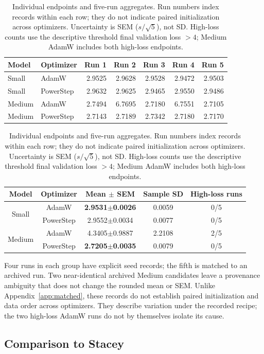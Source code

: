 \documentclass{article}
\begin{document}
\begin{table}[ht]
\centering\small

\begin{tabular}{llrrrrr}\toprule
Model & Optimizer & Run 1 & Run 2 & Run 3 & Run 4 & Run 5\\\midrule
Small & AdamW & 2.9525 & 2.9628 & 2.9528 & 2.9472 & 2.9503\\
Small & PowerStep & 2.9632 & 2.9625 & 2.9465 & 2.9550 & 2.9486\\
Medium & AdamW & 2.7494 & 6.7695 & 2.7180 & 6.7551 & 2.7105\\
Medium & PowerStep & 2.7143 & 2.7189 & 2.7342 & 2.7180 & 2.7170\\\bottomrule
\end{tabular}

\medskip
\begin{tabular}{ccccc}\toprule
Model & Optimizer & Mean $\pm$ SEM & Sample SD & High-loss runs\\\midrule
\multirow{2}{*}{Small} & AdamW & \textbf{2.9531$\pm$0.0026}  & 0.0059 & 0/5\\
& PowerStep & 2.9552$\pm$0.0034 & 0.0077 & 0/5\\
\multirow{2}{*}{Medium} & AdamW & 4.3405$\pm$0.9887 & 2.2108 & 2/5\\
& PowerStep & \textbf{2.7205$\pm$0.0035}  & 0.0079 & 0/5\\\bottomrule
\end{tabular}
\caption{Individual endpoints and five-run aggregates. Run numbers index records within each row; they do not indicate paired initialization across optimizers. Uncertainty is SEM ($s/\sqrt5$), not SD. High-loss counts use the descriptive threshold final validation loss $>4$; Medium AdamW includes both high-loss endpoints.}
\label{tab:seeds}
\end{table}

Four runs in each group have explicit seed records; the fifth is matched to an archived run. Two near-identical archived Medium candidates leave a provenance ambiguity that does not change the rounded mean or SEM. Unlike Appendix~\ref{app:matched}, these records do not establish paired initialization and data order across optimizers. They describe variation under the recorded recipe; the two high-loss AdamW runs do not by themselves isolate its cause.

\FloatBarrier
\subsection{Comparison to Stacey}
\label{sec:stacey}
\end{document}
